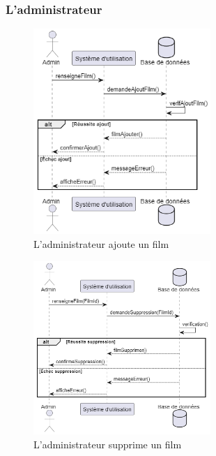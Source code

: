 \documentclass{article}
\begin{document}
\subsubsection{L'administrateur}
\begin{figure}[H]
    \centering
    \includegraphics[width=0.6\textwidth]{images/sequence/admin/seq_admin_1.png}
    \caption{L'administrateur ajoute un film}
\end{figure}
\begin{figure}[H]
    \centering
    \includegraphics[width=0.6\textwidth]{images/sequence/admin/seq_admin_2.png}
    \caption{L'administrateur supprime un film}
\end{figure}
\end{document}
